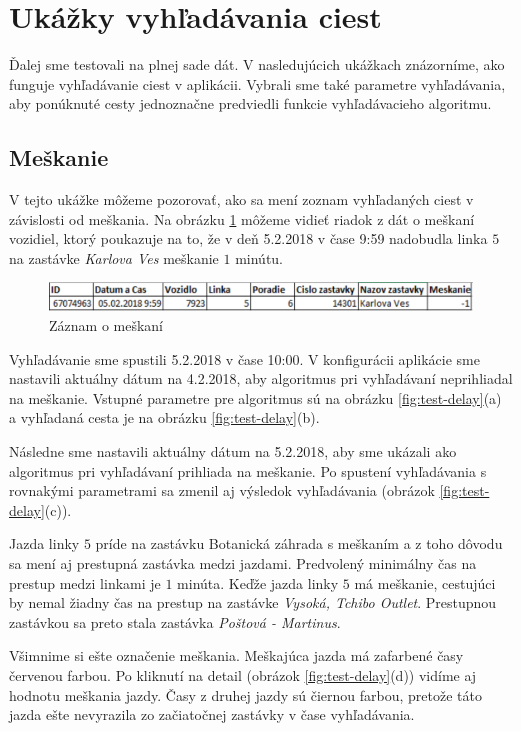 \section{Ukážky vyhľadávania ciest}
Ďalej sme testovali na plnej sade dát. V nasledujúcich ukážkach znázorníme, ako funguje vyhľadávanie ciest v aplikácii. Vybrali sme také parametre vyhľadávania, aby ponúknuté cesty jednoznačne predviedli funkcie vyhľadávacieho algoritmu. 

\subsection{Meškanie}
V tejto ukážke môžeme pozorovať, ako sa mení zoznam vyhľadaných ciest v závislosti od meškania. Na obrázku \ref{fig:delay-row} môžeme vidieť riadok z dát o meškaní vozidiel, ktorý poukazuje na to, že v deň 5.2.2018 v čase 9:59 nadobudla linka $5$ na zastávke \textit{Karlova Ves} meškanie $1$ minútu. 

\begin{figure}[H]
\centerline{\includegraphics[width=1.0\textwidth]{images/delay-row}}
\caption[Záznam o meškaní]{Záznam o meškaní}
\label{fig:delay-row}
\end{figure}

Vyhľadávanie sme spustili 5.2.2018 v čase 10:00. V konfigurácii aplikácie sme nastavili aktuálny dátum na 4.2.2018, aby algoritmus pri vyhľadávaní neprihliadal na meškanie. Vstupné parametre pre algoritmus sú na obrázku \ref{fig:test-delay}(a) a vyhľadaná cesta je na obrázku \ref{fig:test-delay}(b). 

Následne sme nastavili aktuálny dátum na 5.2.2018, aby sme ukázali ako algoritmus pri vyhľadávaní prihliada na meškanie. Po spustení vyhľadávania s rovnakými parametrami sa zmenil aj výsledok vyhľadávania (obrázok \ref{fig:test-delay}(c)). 

Jazda linky $5$ príde na zastávku Botanická záhrada s meškaním a z toho dôvodu sa mení aj prestupná zastávka medzi jazdami. Predvolený minimálny čas na prestup medzi linkami je $1$ minúta. Keďže jazda linky $5$ má meškanie, cestujúci by nemal žiadny čas na prestup na zastávke \textit{Vysoká, Tchibo Outlet}. Prestupnou zastávkou sa preto stala zastávka \textit{Poštová - Martinus}.

Všimnime si ešte označenie meškania. Meškajúca jazda má zafarbené časy červenou farbou. Po kliknutí na detail (obrázok \ref{fig:test-delay}(d)) vidíme aj hodnotu meškania jazdy. Časy z druhej jazdy sú čiernou farbou, pretože táto jazda ešte nevyrazila zo začiatočnej zastávky v čase vyhľadávania. 

